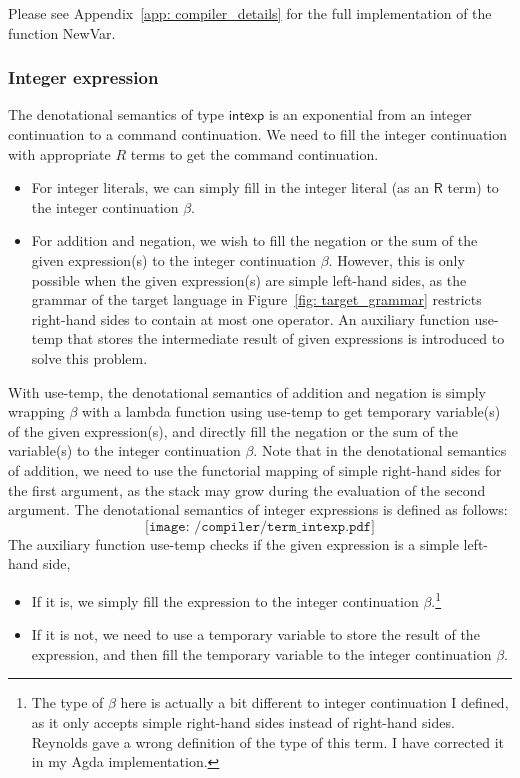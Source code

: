 \documentclass[12pt,a4paper]{report}
\theoremstyle{definition}
\begin{document}
        Please see Appendix~\ref{app: compiler_details} for the full implementation of the function \textsf{NewVar}.

        \subsubsection{Integer expression} \label{subsubsec: compiler_intexp}
        The denotational semantics of type $\mathsf{intexp}$ is an exponential from an integer continuation to a command continuation. We need to fill the integer continuation with appropriate $R$ terms to get the command continuation. 
        \begin{itemize}
            \item For integer literals, we can simply fill in the integer literal (as an $\mathsf{R}$ term) to the integer continuation $\beta$.
            \item For addition and negation, we wish to fill the negation or the sum of the given expression(s) to the integer continuation $\beta$. However, this is only possible when the given expression(s) are simple left-hand sides, as the grammar of the target language in Figure~\ref{fig: target_grammar} restricts right-hand sides to contain at most one operator. An auxiliary function \textsf{use-temp} that stores the intermediate result of given expressions is introduced to solve this problem. 
        \end{itemize}
        With \textsf{use-temp}, the denotational semantics of addition and negation is simply wrapping $\beta$ with a lambda function using \textsf{use-temp} to get temporary variable(s) of the given expression(s), and directly fill the negation or the sum of the variable(s) to the integer continuation $\beta$. Note that in the denotational semantics of addition, we need to use the functorial mapping of simple right-hand sides for the first argument, as the stack may grow during the evaluation of the second argument. The denotational semantics of integer expressions is defined as follows:
        \[\texttt{[image: /compiler/term\_intexp.pdf]}\]
        The auxiliary function \textsf{use-temp} checks if the given expression is a simple left-hand side,
        \begin{itemize}
            \item If it is, we simply fill the expression to the integer continuation $\beta$.\footnote{The type of $\beta$ here is actually a bit different to integer continuation I defined, as it only accepts simple right-hand sides instead of right-hand sides. Reynolds gave a wrong definition of the type of this term. I have corrected it in my Agda implementation.}
            \item If it is not, we need to use a temporary variable to store the result of the expression, and then fill the temporary variable to the integer continuation $\beta$.
        \end{itemize}
\end{document}
